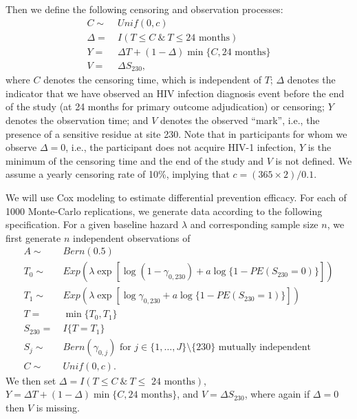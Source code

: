 \documentclass[10pt]{article}
\begin{document}
Then we define the following censoring and observation processes:
\begin{align*}
  C \sim & \ Unif(0, c) \\
  \Delta =& \ I(T \leq C \ \& \ T \leq \text{24 months}) \\
  Y =& \ \Delta T + (1 - \Delta) \min\{C, \text{24 months}\} \\
  V =& \ \Delta S_{230},
\end{align*}
where $C$ denotes the censoring time, which is independent of $T$; $\Delta$ denotes the indicator that we have observed an HIV infection diagnosis event before the end of the study (at 24 months for primary outcome adjudication) or censoring; $Y$ denotes the observation time; and $V$ denotes the observed ``mark'', i.e., the presence of a sensitive residue at site 230. Note that in participants for whom we observe $\Delta = 0$, i.e., the participant does not acquire HIV-1 infection, $Y$ is the minimum of the censoring time and the end of the study and $V$ is not defined. We assume a yearly censoring rate of 10\%, implying that $c = (365 \times 2) / 0.1$.

We will use Cox modeling \citep[][implemented in the \texttt{R} package \texttt{sievePH}]{lunn1995} to estimate differential prevention efficacy. For each of 1000 Monte-Carlo replications, we generate data according to the following specification. For a given baseline hazard $\lambda$ and corresponding sample size $n$, we first generate $n$ independent observations of
\begin{align*}
  A \sim & \ Bern(0.5) \\
  T_0 \sim & \ Exp(\lambda \exp[\log (1 - \gamma_{0, 230}) + a \log\{1 - PE(S_{230} = 0)\}]) \\
  T_1 \sim & \ Exp(\lambda\exp[\log \gamma_{0,230} + a \log\{1 - PE(S_{230} = 1)\}]) \\
  T =& \ \min\{T_0, T_1\} \\
  S_{230} =& \ I\{T = T_1\} \\
  S_j \sim & \ Bern(\gamma_{0,j}) \text{ for } j \in \{1, \ldots, J\} \setminus \{230\} \text{ mutually independent} \\
  C \sim & \ Unif(0, c).
\end{align*}
We then set $\Delta = I(T \leq C \ \& \ T \leq \text{ 24 months})$, $Y = \Delta T + (1 - \Delta) \min\{C, 24 \text{ months}\}$, and $V = \Delta S_{230}$, where again if $\Delta = 0$ then $V$ is missing.
\end{document}
